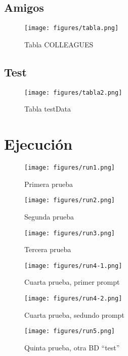 \documentclass[12pt]{article}
\begin{document}
\subsection*{Amigos}
\begin{figure}[ht]
  \centering
  \texttt{[image: figures/tabla.png]}
  \caption{Tabla COLLEAGUES}
\end{figure}
\subsection*{Test}
\begin{figure}[ht]
  \centering
  \texttt{[image: figures/tabla2.png]}
  \caption{Tabla testData}
\end{figure}

\pagebreak
\section*{Ejecución}
\begin{figure}[ht]
  \centering
  \texttt{[image: figures/run1.png]}
  \caption{Primera prueba}
\end{figure}

\begin{figure}[ht]
  \centering
  \texttt{[image: figures/run2.png]}
  \caption{Segunda prueba}
\end{figure}

\begin{figure}[ht]
  \centering
  \texttt{[image: figures/run3.png]}
  \caption{Tercera prueba}
\end{figure}

\begin{figure}[ht]
  \centering
  \texttt{[image: figures/run4-1.png]}
  \caption{Cuarta prueba, primer prompt}
\end{figure}

\begin{figure}[ht]
  \centering
  \texttt{[image: figures/run4-2.png]}
  \caption{Cuarta prueba, sedundo prompt}
\end{figure}

\begin{figure}[ht]
  \centering
  \texttt{[image: figures/run5.png]}
  \caption{Quinta prueba, otra BD ``test''}
\end{figure}
\end{document}
